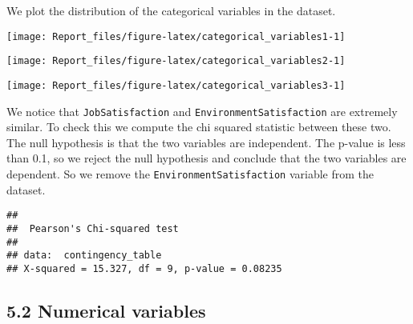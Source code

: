 \documentclass[
]{article}
\newenvironment{Shaded}{\begin{snugshade}}{\end{snugshade}}
\newcommand{\ConstantTok}[1]{\textcolor[rgb]{0.56,0.35,0.01}{#1}}
\newcommand{\FunctionTok}[1]{\textcolor[rgb]{0.13,0.29,0.53}{\textbf{#1}}}
\newcommand{\NormalTok}[1]{#1}
\newcommand{\OtherTok}[1]{\textcolor[rgb]{0.56,0.35,0.01}{#1}}
\newcommand{\SpecialCharTok}[1]{\textcolor[rgb]{0.81,0.36,0.00}{\textbf{#1}}}
\begin{document}
We plot the distribution of the categorical variables in the dataset.

\begin{center}\texttt{[image: Report\_files/figure-latex/categorical\_variables1-1]} \end{center}

\begin{center}\texttt{[image: Report\_files/figure-latex/categorical\_variables2-1]} \end{center}

\begin{center}\texttt{[image: Report\_files/figure-latex/categorical\_variables3-1]} \end{center}

\newpage

We notice that \texttt{JobSatisfaction} and
\texttt{EnvironmentSatisfaction} are extremely similar. To check this we
compute the chi squared statistic between these two. The null hypothesis
is that the two variables are independent. The p-value is less than 0.1,
so we reject the null hypothesis and conclude that the two variables are
dependent. So we remove the \texttt{EnvironmentSatisfaction} variable
from the dataset.

\begin{Shaded}
\end{Shaded}

\begin{verbatim}
## 
##  Pearson's Chi-squared test
## 
## data:  contingency_table
## X-squared = 15.327, df = 9, p-value = 0.08235
\end{verbatim}

\begin{Shaded}
\end{Shaded}

\hypertarget{numerical-variables}{%
\subsection{5.2 Numerical variables}\label{numerical-variables}}
\end{document}
